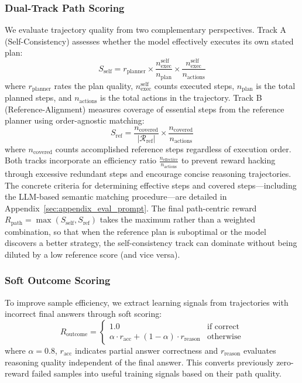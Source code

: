 \documentclass[11pt]{article}
\begin{document}
\subsubsection{Dual-Track Path Scoring}
\label{sssec:dual_track}

We evaluate trajectory quality from two complementary perspectives.
Track A (Self-Consistency) assesses whether the model effectively executes its own stated plan:
\begin{equation}
S_{\text{self}} = r_{\text{planner}} \times \frac{n_{\text{exec}}^{\text{self}}}{n_{\text{plan}}} \times \frac{n_{\text{exec}}^{\text{self}}}{n_{\text{actions}}}
\end{equation}
where $r_{\text{planner}}$ rates the plan quality, $n_{\text{exec}}^{\text{self}}$ counts executed steps, $n_{\text{plan}}$ is the total planned steps, and $n_{\text{actions}}$ is the total actions in the trajectory.
Track B (Reference-Alignment) measures coverage of essential steps from the reference planner using order-agnostic matching:
\begin{equation}
S_{\text{ref}} = \frac{n_{\text{covered}}}{|\mathcal{R}_{\text{ref}}|}  \times \frac{n_{\text{covered}}}{n_{\text{actions}}}
\end{equation}
where $n_{\text{covered}}$ counts accomplished reference steps regardless of execution order.
Both tracks incorporate an efficiency ratio $\frac{n_{\text{effective}}}{n_{\text{actions}}}$ to prevent reward hacking through excessive redundant steps and encourage concise reasoning trajectories.
The concrete criteria for determining effective steps and covered steps---including the LLM-based semantic matching procedure---are detailed in Appendix~\ref{sec:appendix_eval_prompt}.
The final path-centric reward $R_{\text{path}} = \max(S_{\text{self}}, S_{\text{ref}})$ takes the maximum rather than a weighted combination, so that when the reference plan is suboptimal or the model discovers a better strategy, the self-consistency track can dominate without being diluted by a low reference score (and vice versa).

\subsubsection{Soft Outcome Scoring}
\label{sssec:soft_outcome}

To improve sample efficiency, we extract learning signals from trajectories with incorrect final answers through soft scoring:
\begin{equation}
R_{\text{outcome}} =
\begin{cases}
1.0 & \text{if correct} \\
\alpha \cdot r_{\text{acc}} + (1-\alpha) \cdot r_{\text{reason}} & \text{otherwise}
\end{cases}
\end{equation}
where $\alpha=0.8$, $r_{\text{acc}}$ indicates partial answer correctness and $r_{\text{reason}}$ evaluates reasoning quality independent of the final answer.
This converts previously zero-reward failed samples into useful training signals based on their path quality.
\end{document}

